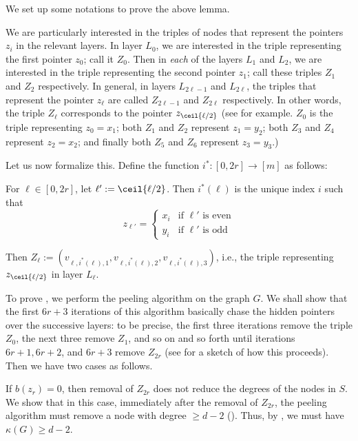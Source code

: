 We set up some notations to prove the above lemma.

 We are particularly interested in the triples of nodes that represent the pointers $z_i$ in the relevant layers. In layer $L_0$, we are interested in the triple representing the first pointer $z_0$; call it $Z_0$. Then in \emph{each} of the layers $L_1$ and $L_2$, we are interested in the triple representing the second pointer $z_1$; call these triples $Z_1$ and $Z_2$ respectively. In general, in layers $L_{2\ell-1}$ and $L_{2\ell}$, the triples that represent the pointer $z_\ell$ are called $Z_{2\ell-1}$ and $Z_{2\ell}$ respectively. In other words, the triple $Z_{\ell}$ corresponds to the pointer $z_{\ceil{\ell/2}}$ (see  for example. $Z_0$ is the triple representing $z_0=x_1$; both $Z_1$ and $Z_2$ represent $z_1=y_2$; both $Z_3$ and $Z_4$ represent $z_2=x_2$; and finally both $Z_5$ and $Z_6$ represent $z_3=y_3$.)

Let us now formalize this. Define the function $i^*:[0,2r]\to [m]$ as follows:

For $\ell\in [0,2r]$, let $\ell' := \ceil{\ell/2}$. Then $i^*(\ell)$ is the unique index $i$ such that 
$$z_{\ell'}= 
\begin{cases}
x_{i} & \text{if $\ell'$ is even}\\
y_{i} & \text{if $\ell'$ is odd}
\end{cases}
$$

Then $Z_\ell:= (v_{\ell,i^*(\ell),1}, v_{\ell,i^*(\ell),2},v_{\ell,i^*(\ell),3})$, i.e., the triple representing $z_{\ceil{\ell/2}}$ in layer $L_\ell$.

 To prove , we perform the peeling algorithm on the graph $G$. We shall show that the first $6r+3$ iterations of this algorithm basically chase the hidden pointers over the successive layers: to be precise, the first three iterations remove the triple $Z_0$, the next three remove $Z_1$, and so on and so forth until iterations $6r+1,6r+2$, and $6r+3$ remove $Z_{2r}$ (see  for a sketch of how this proceeds). Then we have two cases as follows. 

If $b(z_r)=0$, then removal of $Z_{2r}$ does not reduce the degrees of the nodes in $S$. We show that in this case, immediately after the removal of $Z_{2r}$, the peeling algorithm must remove a node with degree $\geq d-2$ (). Thus, by , we must have $\kappa(G)\geq d-2$.

